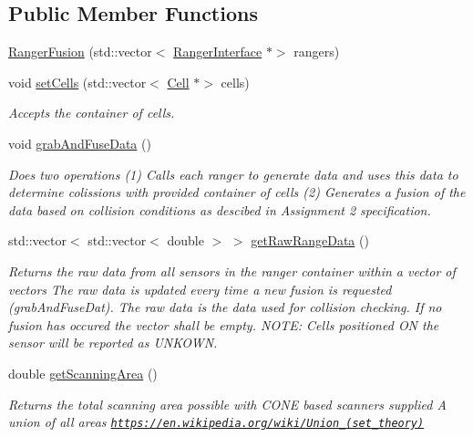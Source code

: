 \subsection*{Public Member Functions}
\begin{DoxyCompactItemize}
\item 
\hyperlink{classRangerFusion_ae06d13fa52742f42e138b386e5022168}{Ranger\+Fusion} (std\+::vector$<$ \hyperlink{classRangerInterface}{Ranger\+Interface} $\ast$$>$ rangers)
\item 
void \hyperlink{classRangerFusion_a9b69869bd1e3bca155bcecbad5ea463b}{set\+Cells} (std\+::vector$<$ \hyperlink{classCell}{Cell} $\ast$$>$ cells)
\begin{DoxyCompactList}\small\item\em Accepts the container of cells. \end{DoxyCompactList}\item 
\mbox{\label{classRangerFusion_aa9265f72bc3572567c9cf98cf6d9f0e1}} 
void \hyperlink{classRangerFusion_aa9265f72bc3572567c9cf98cf6d9f0e1}{grab\+And\+Fuse\+Data} ()
\begin{DoxyCompactList}\small\item\em Does two operations (1) Calls each ranger to generate data and uses this data to determine colissions with provided container of cells (2) Generates a \textquotesingle{}fusion\textquotesingle{} of the data based on collision conditions as descibed in Assignment 2 specification. \end{DoxyCompactList}\item 
std\+::vector$<$ std\+::vector$<$ double $>$ $>$ \hyperlink{classRangerFusion_a5780383fdffe121a7a2372a047819ba9}{get\+Raw\+Range\+Data} ()
\begin{DoxyCompactList}\small\item\em Returns the raw data from all sensors in the ranger container within a vector of vectors The raw data is updated every time a new fusion is requested (grab\+And\+Fuse\+Dat). The raw data is the data used for collision checking. If no fusion has occured the vector shall be empty. N\+O\+TE\+: Cells positioned ON the sensor will be reported as U\+N\+K\+O\+WN. \end{DoxyCompactList}\item 
double \hyperlink{classRangerFusion_a7215e5405e808b5a853984e2b70ed6ad}{get\+Scanning\+Area} ()
\begin{DoxyCompactList}\small\item\em Returns the total scanning area possible with C\+O\+NE based scanners supplied A union of all areas \href{https://en.wikipedia.org/wiki/Union_(set_theory)}{\tt https\+://en.\+wikipedia.\+org/wiki/\+Union\+\_\+(set\+\_\+theory)} \end{DoxyCompactList}\end{DoxyCompactItemize}


